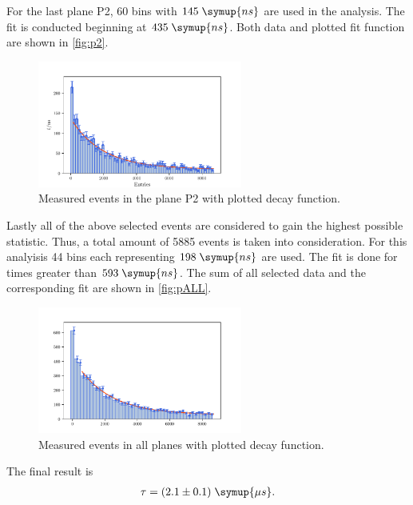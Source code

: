 For the last plane P2, 60 bins with $145\;\symup{ns}$ are used in the analysis. The fit is conducted 
beginning at $435\;\symup{ns}$. Both data and plotted fit function are shown in \autoref{fig:p2}.\\
\begin{figure}
    \centering
    \includegraphics[width=0.6\textwidth]{plots/p2.pdf}
    \caption{Measured events in the plane P2 with plotted decay function.}
    \label{fig:p2}
\end{figure}
Lastly all of the above selected events are considered to gain the highest possible statistic.
Thus, a total amount of 5885 events is taken into consideration. For this analyisis 44 bins each 
representing $198\;\symup{ns}$ are used. The fit is done for times greater than $593\;\symup{ns}$.
The sum of all selected data and the corresponding fit are shown in \autoref{fig:pALL}.

\begin{figure}
    \centering
    \includegraphics[width=0.6\textwidth]{plots/pALL.pdf}
    \caption{Measured events in all planes with plotted decay function.}
    \label{fig:pALL}
\end{figure}
The final result is 
\begin{align*}
    \tau = (2.1 \pm 0.1) \; \symup{\mu s}.
\end{align*} 
